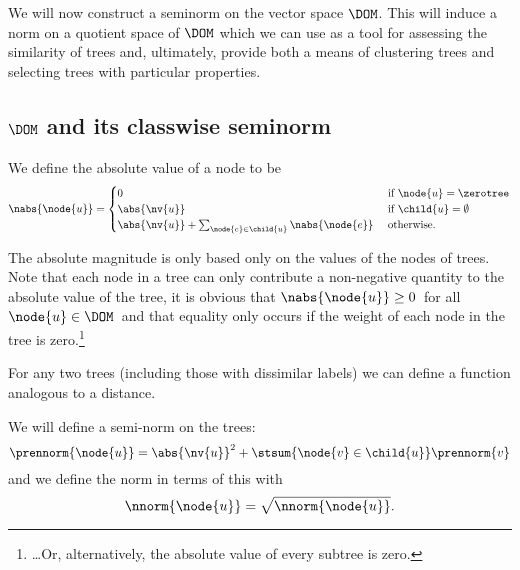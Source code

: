 We will now construct a seminorm on the vector space
$\DOM$. This will induce a norm on a quotient space of $\DOM$ which we
can use as a tool for assessing the similarity of trees and,
ultimately, provide both a means of clustering trees and selecting
trees with particular properties.

\subsection{$\DOM$ and its classwise seminorm}
\begin{definition}\label{absolute-mag}
 We define the absolute value of a node to be
\begin{align*}
\nabs{\node{u}} = \begin{cases}
  0 & \text{ if } \node{u} = \zerotree \\
  \abs{\nv{u}} & \text{ if }\child{u} = \emptyset \\
  \abs{\nv{u}} + \sum_{\node{e}\in\child{u}}\nabs{\node{e}} & \text{ otherwise.}
\end{cases}
\end{align*}
\end{definition}
The absolute magnitude is only based only on the values of the
nodes of trees. %
Note that each node in a tree can only contribute a non-negative
quantity to the absolute value of the tree, it is obvious that
\(\nabs{\node{u}} \geq 0\)\ for all \(\node{u} \in \DOM\)\ and that
equality only occurs if the weight of each node in the tree 
is zero.\footnote{\ldots Or, alternatively, the absolute value of every subtree is zero.}

For any two trees (including those with dissimilar labels) we can
define a function analogous to a distance.

\begin{definition}\label{treenorm}
  We will define a semi-norm on the trees:
  \begin{equation}
    \prennorm{\node{u}}={\abs{\nv{u}}^2 + \stsum{\node{v}\in\child{u}} \prennorm{v}}
  \end{equation}
  and we define the norm in terms of this with
  \begin{equation}
    \nnorm{\node{u}}=\sqrt{\nnorm{\node{u}}}.
  \end{equation}
\end{definition}

